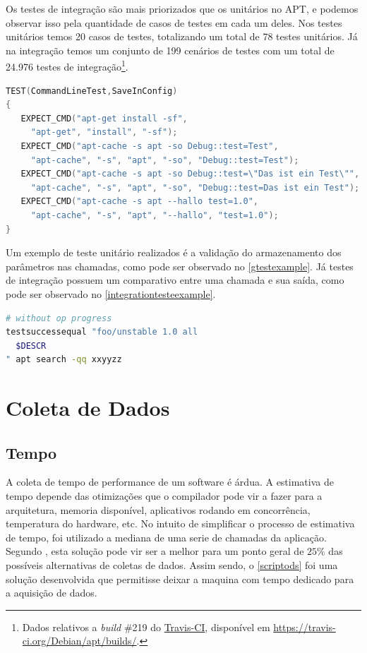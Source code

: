 Os testes de integração são mais priorizados que os unitários no APT, e podemos observar isso pela quantidade de casos de testes em cada um deles. Nos testes unitários temos 20 casos de testes, totalizando um total de 78 testes unitários. Já na integração temos um conjunto de 199 cenários de testes com um total de 24.976 testes de integração\footnote{Dados relativos a \textit{build} \#219 do \href{https://travis-ci.org/Debian/apt/builds/}{Travis-CI}, disponível em \url{https://travis-ci.org/Debian/apt/builds/}.}.


\begin{lstlisting}[language=C++,label=gtestexample,caption={Teste de validação de armazenamento de parâmetros}]
TEST(CommandLineTest,SaveInConfig)
{
   EXPECT_CMD("apt-get install -sf",
	 "apt-get", "install", "-sf");
   EXPECT_CMD("apt-cache -s apt -so Debug::test=Test",
	 "apt-cache", "-s", "apt", "-so", "Debug::test=Test");
   EXPECT_CMD("apt-cache -s apt -so Debug::test=\"Das ist ein Test\"",
	 "apt-cache", "-s", "apt", "-so", "Debug::test=Das ist ein Test");
   EXPECT_CMD("apt-cache -s apt --hallo test=1.0",
	 "apt-cache", "-s", "apt", "--hallo", "test=1.0");
}
\end{lstlisting}

Um exemplo de teste unitário realizados é a validação do armazenamento dos parâmetros nas chamadas, como pode ser observado no \autoref{gtestexample}. Já testes de integração possuem um comparativo entre uma chamada e sua saída, como pode ser observado no \autoref{integrationtesteexample}.

\begin{lstlisting}[language=Bash,label=integrationtesteexample,caption={Teste de verificação de saída para busca}]
# without op progress
testsuccessequal "foo/unstable 1.0 all
  $DESCR
" apt search -qq xxyyzz
\end{lstlisting}



\section{Coleta de Dados} %
\label{cha:coleta_de_dados}

\subsection*{Tempo} %
\label{sec:tempo}

A coleta de tempo de performance de um software é árdua. A estimativa de tempo depende das otimizações que o compilador pode vir a fazer para a arquitetura, memoria disponível, aplicativos rodando em concorrência, temperatura do hardware, etc. No intuito de simplificar o processo de estimativa de tempo, foi utilizado a mediana de uma serie de chamadas da aplicação. Segundo , esta solução pode vir ser a melhor para um ponto geral de $25\%$ das possíveis alternativas de coletas de dados. Assim sendo, o \autoref{scriptods} foi uma solução desenvolvida que permitisse deixar a maquina com tempo dedicado para a aquisição de dados.

